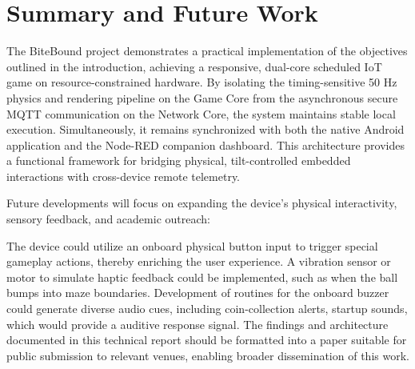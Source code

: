 \section{Summary and Future Work}
\label{sec:summary-future-work}

The BiteBound project demonstrates a practical implementation of the objectives outlined in the introduction, achieving a responsive, dual-core scheduled IoT game on resource-constrained hardware.
By isolating the timing-sensitive 50 Hz physics and rendering pipeline on the Game Core from the asynchronous secure MQTT communication on the Network Core, the system maintains stable local execution.
Simultaneously, it remains synchronized with both the native Android application and the Node-RED companion dashboard.
This architecture provides a functional framework for bridging physical, tilt-controlled embedded interactions with cross-device remote telemetry.

Future developments will focus on expanding the device's physical interactivity, sensory feedback, and academic outreach:

The device could utilize an onboard physical button input to trigger special gameplay actions, thereby enriching the user experience.
A vibration sensor or motor to simulate haptic feedback could be implemented, such as when the ball bumps into maze boundaries.
Development of routines for the onboard buzzer could generate diverse audio cues, including coin-collection alerts, startup sounds, which would provide a auditive response signal.
The findings and architecture documented in this technical report should be formatted into a paper suitable for public submission to relevant venues, enabling broader dissemination of this work.